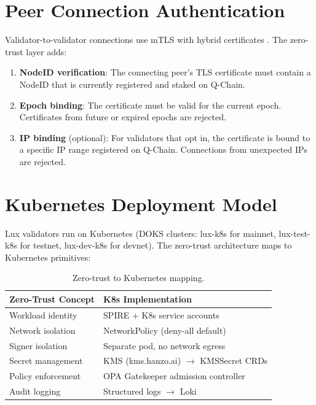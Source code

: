 \documentclass[11pt]{article}
\begin{document}
\section{Peer Connection Authentication}

Validator-to-validator connections use mTLS with hybrid certificates \cite{hybrid-certs}. The zero-trust layer adds:

\begin{enumerate}
\item \textbf{NodeID verification}: The connecting peer's TLS certificate must contain a NodeID that is currently registered and staked on Q-Chain.
\item \textbf{Epoch binding}: The certificate must be valid for the current epoch. Certificates from future or expired epochs are rejected.
\item \textbf{IP binding} (optional): For validators that opt in, the certificate is bound to a specific IP range registered on Q-Chain. Connections from unexpected IPs are rejected.
\end{enumerate}

\section{Kubernetes Deployment Model}

Lux validators run on Kubernetes (DOKS clusters: lux-k8s for mainnet, lux-test-k8s for testnet, lux-dev-k8s for devnet). The zero-trust architecture maps to Kubernetes primitives:

\begin{table}[h]
\centering
\small
\begin{tabular}{@{}ll@{}}
\toprule
\textbf{Zero-Trust Concept} & \textbf{K8s Implementation} \\
\midrule
Workload identity & SPIRE + K8s service accounts \\
Network isolation & NetworkPolicy (deny-all default) \\
Signer isolation & Separate pod, no network egress \\
Secret management & KMS (kms.hanzo.ai) $\to$ KMSSecret CRDs \\
Policy enforcement & OPA Gatekeeper admission controller \\
Audit logging & Structured logs $\to$ Loki \\
\bottomrule
\end{tabular}
\caption{Zero-trust to Kubernetes mapping.}
\label{tab:k8s-mapping}
\end{table}
\end{document}
